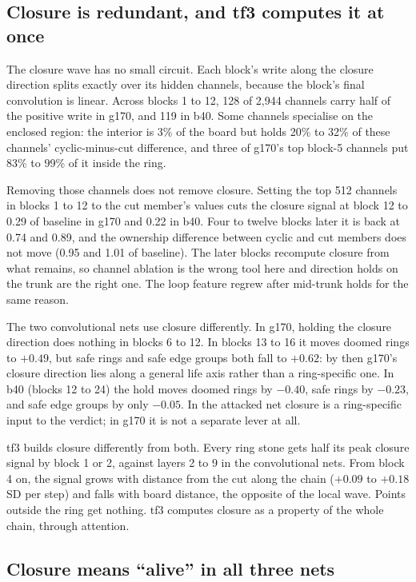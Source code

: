 \documentclass[11pt]{article}
\newcommand{\pos}[1]{$+#1$}
\newcommand{\nega}[1]{$-#1$}
\begin{document}
\subsection{Closure is redundant, and tf3 computes it at once}

The closure wave has no small circuit. Each block's write along the closure direction splits exactly over its hidden channels, because the block's final convolution is linear. Across blocks 1 to 12, 128 of 2,944 channels carry half of the positive write in g170, and 119 in b40. Some channels specialise on the enclosed region: the interior is 3\% of the board but holds 20\% to 32\% of these channels' cyclic-minus-cut difference, and three of g170's top block-5 channels put 83\% to 99\% of it inside the ring.

Removing those channels does not remove closure. Setting the top 512 channels in blocks 1 to 12 to the cut member's values cuts the closure signal at block 12 to 0.29 of baseline in g170 and 0.22 in b40. Four to twelve blocks later it is back at 0.74 and 0.89, and the ownership difference between cyclic and cut members does not move (0.95 and 1.01 of baseline). The later blocks recompute closure from what remains, so channel ablation is the wrong tool here and direction holds on the trunk are the right one. The loop feature regrew after mid-trunk holds for the same reason.

The two convolutional nets use closure differently. In g170, holding the closure direction does nothing in blocks 6 to 12. In blocks 13 to 16 it moves doomed rings to \pos{0.49}, but safe rings and safe edge groups both fall to \pos{0.62}: by then g170's closure direction lies along a general life axis rather than a ring-specific one. In b40 (blocks 12 to 24) the hold moves doomed rings by \nega{0.40}, safe rings by \nega{0.23}, and safe edge groups by only \nega{0.05}. In the attacked net closure is a ring-specific input to the verdict; in g170 it is not a separate lever at all.

tf3 builds closure differently from both. Every ring stone gets half its peak closure signal by block 1 or 2, against layers 2 to 9 in the convolutional nets. From block 4 on, the signal grows with distance from the cut along the chain (\pos{0.09} to \pos{0.18} SD per step) and falls with board distance, the opposite of the local wave. Points outside the ring get nothing. tf3 computes closure as a property of the whole chain, through attention.

\subsection{Closure means ``alive'' in all three nets}
\label{sec:closurealive}
\end{document}
